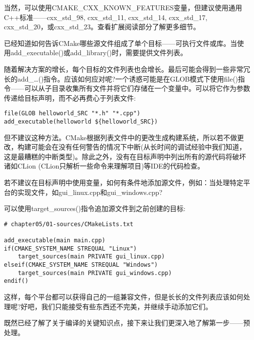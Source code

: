 \begin{tcolorbox}[colback=blue!5!white,colframe=blue!75!black,title=重要的Note]
当然，可以使用CMAKE\_CXX\_KNOWN\_FEATURES变量，但建议使用通用C++标准——cxx\_std\_98, cxx\_std\_11, cxx\_std\_14, cxx\_std\_17, cxx\_std\_20，或cxx\_std\_23。查看扩展阅读部分了解更多细节。
\end{tcolorbox}


已经知道如何告诉CMake哪些源文件组成了单个目标——可执行文件或库。当使用add\_executable()或add\_library()时，需要提供文件列表。

随着解决方案的增长，每个目标的文件列表也会增长。最后可能会得到一些非常冗长的add\_…()指令。应该如何应对呢?一个诱惑可能是在GLOB模式下使用file()指令——可以从子目录收集所有文件并将它们存储在一个变量中。可以将它作为参数传递给目标声明，而不必再费心于列表文件:

\begin{lstlisting}[style=styleCMake]
file(GLOB helloworld_SRC "*.h" "*.cpp")
add_executable(helloworld ${helloworld_SRC})
\end{lstlisting}

但不建议这种方法。CMake根据列表文件中的更改生成构建系统，所以若不做更改，构建可能会在没有任何警告的情况下中断(从长时间的调试经验中我们知道，这是最糟糕的中断类型)。除此之外，没有在目标声明中列出所有的源代码将破坏诸如CLion (CLion只解析一些命令来理解项目)等IDE的代码检查。

若不建议在目标声明中使用变量，如何有条件地添加源文件，例如：当处理特定平台的实现文件，如gui\_linux.cpp和gui\_windows.cpp?

可以使用target\_sources()指令追加源文件到之前创建的目标:

\begin{lstlisting}[style=styleCMake]
# chapter05/01-sources/CMakeLists.txt

add_executable(main main.cpp)
if(CMAKE_SYSTEM_NAME STREQUAL "Linux")
	target_sources(main PRIVATE gui_linux.cpp)
elseif(CMAKE_SYSTEM_NAME STREQUAL "Windows")
	target_sources(main PRIVATE gui_windows.cpp)
endif()
\end{lstlisting}

这样，每个平台都可以获得自己的一组兼容文件，但是长长的文件列表应该如何处理呢?好吧，我们只能接受有些东西还不完美，并继续手动添加它们。

既然已经了解了关于编译的关键知识点，接下来让我们更深入地了解第一步——预处理。























